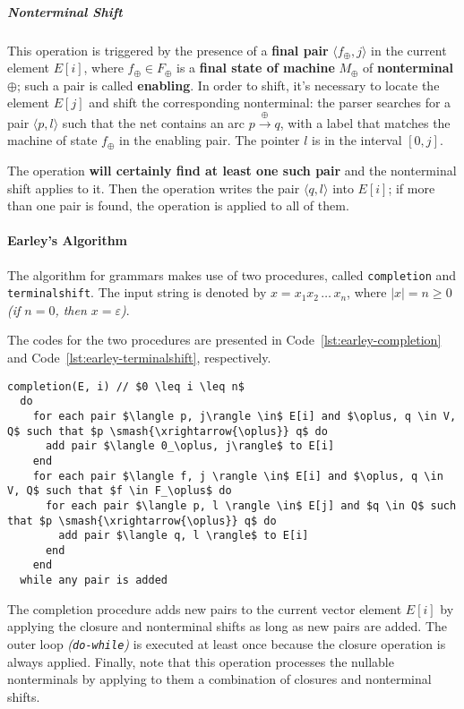 \subparagraph*{Nonterminal Shift}
This operation is triggered by the presence of a \textbf{final pair} \(\langle f_\oplus, j \rangle\) in the current element \(E[i]\), where \(f_\oplus \in F_\oplus\) is a \textbf{final state of machine }\(M_\oplus\) of \textbf{nonterminal} \(\oplus\);
such a pair is called \textbf{enabling}.
In order to shift, it's necessary to locate the element \(E[j]\) and shift the corresponding nonterminal:
the parser searches for a pair \(\langle p, l \rangle\) such that the net contains an arc \(p \xrightarrow{\oplus} q\), with a label that matches the machine of state \(f_\oplus\) in the enabling pair.
The pointer \(l\) is in the interval \(\left[ 0, j \right]\).

The operation \textbf{will certainly find at least one such pair} and the nonterminal shift applies to it.
Then the operation writes the pair \(\langle q, l\rangle\) into \(E[i]\); if more than one pair is found, the operation is applied to all of them.

\paragraph{Earley's Algorithm}

The algorithm for \EBNF grammars makes use of two procedures, called \texttt{completion} and \texttt{terminalshift}.
The input string is denoted by \(x = x_1 x_2 \,\ldots\, x_n\), where \(|x| = n \geq 0\) \textit{(if \(n = 0\), then \(x = \varepsilon\))}.

The codes for the two procedures are presented in Code~\ref{lst:earley-completion} and Code~\ref{lst:earley-terminalshift}, respectively.

\begin{lstlisting}[caption={\texttt{completion} procedure}, label={lst:earley-completion}]
completion(E, i) // $0 \leq i \leq n$
  do
    for each pair $\langle p, j\rangle \in$ E[i] and $\oplus, q \in V, Q$ such that $p \smash{\xrightarrow{\oplus}} q$ do
      add pair $\langle 0_\oplus, j\rangle$ to E[i]
    end
    for each pair $\langle f, j \rangle \in$ E[i] and $\oplus, q \in V, Q$ such that $f \in F_\oplus$ do
      for each pair $\langle p, l \rangle \in$ E[j] and $q \in Q$ such that $p \smash{\xrightarrow{\oplus}} q$ do
        add pair $\langle q, l \rangle$ to E[i]
      end
    end
  while any pair is added
\end{lstlisting}

The completion procedure adds new pairs to the current vector element \(E[i]\) by applying the closure and nonterminal shifts as long as new pairs are added.
The outer loop \textit{(\texttt{do-while})} is executed at least once because the closure operation is always applied.
Finally, note that this operation processes the nullable nonterminals by applying to them a combination of closures and nonterminal shifts.

